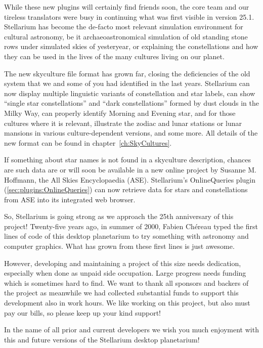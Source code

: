 While these new plugins will certainly find friends soon, the core team and our tireless translators were busy 
in continuing what was first visible in version 25.1. 
Stellarium has become the de-facto most relevant simulation environment for cultural astronomy, 
be it archaeoastronomical simulation of old standing stone rows under simulated skies of yesteryear, 
or explaining the constellations and how they can be used in the lives of the many cultures living on our planet. 

The new skyculture file format has grown far, closing the deficiencies of the old system that we and some of you had identified in the last years. 
Stellarium can now display multiple linguistic variants of constellation and star labels, can show ``single star constellations'' and ``dark constellations'' 
formed by dust clouds in the Milky Way, can properly identify Morning and Evening star, and for those cultures where it is relevant, 
illustrate the zodiac and lunar stations or lunar mansions in various culture-dependent versions, and some more. 
All details of the new format can be found in chapter~\ref{ch:SkyCultures}.

If something about star names is not found in a skyculture description, chances are such data are 
or will soon be available in a new online project by Susanne M. Hoffmann, the All Skies Encyclopaedia (ASE). 
Stellarium's OnlineQueries plugin (\ref{sec:plugins:OnlineQueries}) can now retrieve data for stars and constellations from ASE into its integrated web browser. 


So, Stellarium is going strong as we approach the  25th anniversary of this project! 
Twenty-five years ago, in summer of 2000,  Fabien Ch\'ereau typed the
first lines of code of this desktop planetarium to try something with astronomy and computer graphics. 
What has grown from these first lines is just awesome.


However, developing and maintaining a project of this size needs dedication, especially when done as unpaid side occupation. 
Large progress needs funding which is sometimes hard to find. 
We want to thank all sponsors and backers of the project as meanwhile we had collected substantial funds to support this development 
also in work hours. We like working on this project, but also must pay our bills, so please keep up your kind support! 




In the name of all prior and current developers we wish you much enjoyment with
this and future versions of the Stellarium desktop planetarium!

